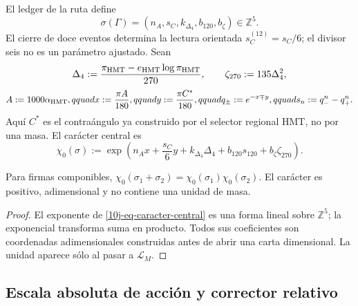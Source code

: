 \begin{definition}
\label{10j-def-firma-caracter}
El ledger de la ruta define
\begin{equation}
 \sigma(\Gamma)=
 (n_A,s_C,k_{\Delta_4},b_{120},b_\zeta)\in\mathbb Z^5.
 \label{10j-eq-firma-z5}
\end{equation}
El cierre de doce eventos determina la lectura orientada
\(s_C^{(12)}=s_C/6\); el divisor seis no es un parámetro ajustado. Sean
\begin{equation}
 \Delta_4:=
 \frac{\pi_{\rm HMT}-e_{\rm HMT}\log\pi_{\rm HMT}}{270},
 \qquad \zeta_{270}:=135\Delta_4^2,
 \label{10j-eq-delta-zeta}
\end{equation}
\begin{equation}
 A:=1000\alpha_{\rm HMT},qquad
 x:=\frac{\pi A}{180},qquad
 y:=\frac{\pi C^*}{180},qquad
 q_\pm:=e^{-x\mp y},qquad
 s_n:=q_-^n-q_+^n .
 \label{10j-eq-canales}
\end{equation}
Aquí \(C^*\) es el contraángulo ya construido por el selector regional HMT,
no por una masa. El carácter central es
\begin{equation}
 \chi_0(\sigma):=
 \exp\!\left(
 n_Ax+\frac{s_C}{6}y+k_{\Delta_4}\Delta_4
 +b_{120}s_{120}+b_\zeta\zeta_{270}
 \right).
 \label{10j-eq-caracter-central}
\end{equation}
\end{definition}

\begin{lemma}
\label{10j-lem-caracter}
Para firmas componibles,
\(
 \chi_0(\sigma_1+\sigma_2)=\chi_0(\sigma_1)\chi_0(\sigma_2)
\). El carácter es positivo, adimensional y no contiene una unidad de masa.
\end{lemma}

\begin{proof}
El exponente de \eqref{10j-eq-caracter-central} es una forma lineal sobre
\(\mathbb Z^5\); la exponencial transforma suma en producto. Todos sus
coeficientes son coordenadas adimensionales construidas antes de abrir una
carta dimensional. La unidad aparece sólo al pasar a \(\mathcal L_M\).
\end{proof}

\subsection{Escala absoluta de acción y corrector relativo}

